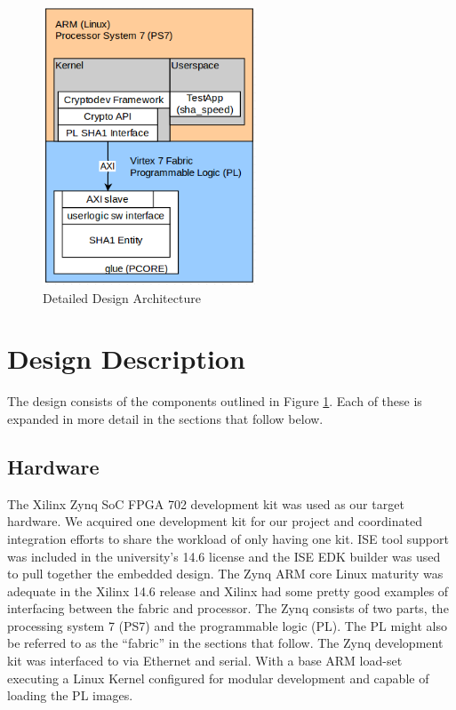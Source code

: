 \documentclass[journal]{IEEEtran}
\begin{document}
\begin{figure}[ht]
\centering
\includegraphics[width=2.5in]{lowleveldesigndiagram.png}
\caption{Detailed Design Architecture}
\label{fig_archBlkDetailed}
\end{figure} 


\section{Design Description}
The design consists of the components outlined in Figure \ref{fig_archBlkDetailed}.  Each of these is expanded in more detail in the sections that follow below.
\subsection{Hardware}
The Xilinx Zynq SoC FPGA 702 development kit was used as our target hardware. We acquired one development kit for our project and coordinated integration efforts to share the workload of only having one kit.  ISE tool support was included in the university's 14.6 license and the ISE EDK builder was used to pull together the embedded design. The Zynq ARM core Linux maturity was adequate in the Xilinx 14.6 release and Xilinx had some pretty good examples of interfacing between the fabric and processor. \cite{XIL2013} \cite{XILGNU2013}   The Zynq consists of two parts, the processing system 7 (PS7) and the programmable logic (PL). The PL might also be referred to as the “fabric” in the sections that follow.  The Zynq development kit was interfaced to via Ethernet and serial. With a base ARM load-set executing a Linux Kernel configured for modular development and capable of loading the PL images.
\end{document}
